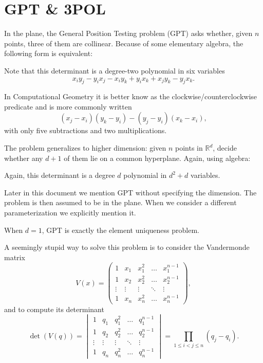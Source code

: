 \section{GPT \& 3POL}\label{sec:problem:pol}

In the plane, the General Position Testing problem (GPT) asks whether, given
\(n\) points, three of them are collinear. Because of some
elementary algebra, the following form is equivalent:
%


Note that this determinant is a degree-two polynomial in six variables
\begin{displaymath}
	x_i y_j - y_i x_j - x_i y_k + y_i x_k + x_j y_k - y_j x_k.
\end{displaymath}

In Computational Geometry it is better know as the clockwise/counterclockwise predicate
and is more commonly written
\begin{displaymath}
	(x_j - x_i)(y_k - y_i) - (y_j - y_i)(x_k - x_i),
\end{displaymath}
with only five subtractions and two multiplications.

The problem generalizes to higher dimension: given \(n\) points in
\(\mathbb{R}^d\), decide whether any \(d+1\) of them lie on a common
hyperplane. Again, using algebra:
%


Again, this determinant is a degree \(d\) polynomial in
\(d^2 + d\) variables.

Later in this document we mention GPT without specifying the dimension.
The problem is then assumed to be in the plane.
When we consider a different parameterization we explicitly mention it.

When \(d=1\), GPT is exactly the element uniqueness problem.
%


A seemingly stupid way to solve this problem is to
consider the Vandermonde matrix
%
\begin{displaymath}
V(x) = \begin{pmatrix}
    1       & x_1     & x_1^2     & \dots  & x_1^{n-1}     \\
    1       & x_2     & x_2^2     & \dots  & x_2^{n-1}     \\
    \vdots  & \vdots  & \vdots    & \ddots & \vdots        \\
    1       & x_n & x_n^2 & \dots  & x_n^{n-1}
\end{pmatrix},
\end{displaymath}
%
and to compute its determinant
%
\begin{displaymath}
\det(V(q)) = \begin{vmatrix}
    1       & q_1     & q_1^2     & \dots  & q_1^{n-1}     \\
    1       & q_2     & q_2^2     & \dots  & q_2^{n-1}     \\
    \vdots  & \vdots  & \vdots    & \ddots & \vdots        \\
    1       & q_n & q_n^2 & \dots  & q_n^{n-1}
\end{vmatrix}
=
\prod_{1 \leq i < j \leq n} (q_j - q_i).
\end{displaymath}

